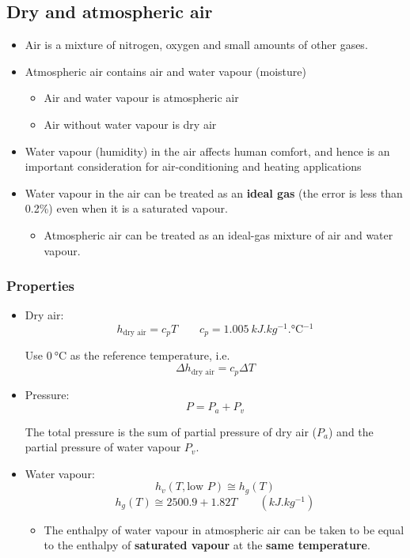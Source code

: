 \documentclass[11pt]{article}
\begin{document}
\subsection{Dry and atmospheric air}
\label{sec:org2ddd44a}
\begin{itemize}
\item Air is a mixture of nitrogen, oxygen and small amounts of other gases.
\item Atmospheric air contains air and water vapour (moisture)
\begin{itemize}
\item Air and water vapour is atmospheric air
\item Air without water vapour is dry air
\end{itemize}
\item Water vapour (humidity) in the air affects human comfort, and hence is an important consideration for air-conditioning and heating applications
\item Water vapour in the air can be treated as an \textbf{ideal gas} (the error is less than 0.2\%) even when it is a saturated vapour.
\begin{itemize}
\item Atmospheric air can be treated as an ideal-gas mixture of air and water vapour.
\end{itemize}
\end{itemize}
\subsubsection{Properties}
\label{sec:org23c18ea}
\begin{itemize}
\item Dry air:
\[h_{\text{dry air}} = c_p T \qquad c_p = \qty{1.005}{kJ.kg^{-1}.\degreeCelsius^{-1}}\]

Use \(\qty{0}{\degreeCelsius}\) as the reference temperature, i.e.
\[\Delta h_{\text{dry air}} = c_p \Delta T\]

\item Pressure:
\[P = P_a + P_v\]

The total pressure is the sum of partial pressure of dry air (\(P_a\)) and the partial pressure of water vapour \(P_v\).

\item Water vapour:
\[h_v (T, \text{low } P) \cong h_g (T)\]
\[h_g (T) \cong 2500.9 + 1.82 T \qquad (\unit{kJ.kg^{-1}})\]

\begin{itemize}
\item The enthalpy of water vapour in atmospheric air can be taken to be equal to the enthalpy of \textbf{saturated vapour} at the \textbf{same temperature}.
\end{itemize}
\end{itemize}
\end{document}

